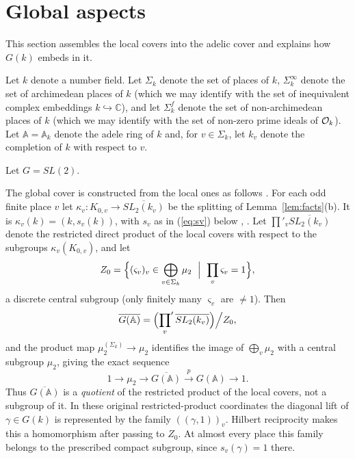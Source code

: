 \documentclass[12pt,letterpaper,openany]{book}
\theoremstyle{plain}
\theoremstyle{definition}
\theoremstyle{remark}
\theoremstyle{remark}
\begin{document}
\section{Global aspects}\label{sec:global}

This section assembles the local covers into the adelic cover and explains how $G(k)$ embeds in it.


Let $k$ denote a number field. Let $\Sigma _k$ denote the set of places of
$k$, $\Sigma _k^\infty $ denote the set of archimedean places of
$k$ (which we may identify with the set of inequivalent
complex embeddings $k\hookrightarrow {\mathbb{C}}$), and let
$\Sigma _k^f$ denote the set of non-archimedean places of
$k$ (which we may identify with the set of non-zero prime ideals of
${\cal{O}}_k$). Let ${\mathbb{A}}={\mathbb{A}}_k$ denote the adele
ring of $k$ and, for $v\in \Sigma _k$, let $k_v$ denote
the completion of $k$ with respect to $v$.

Let $G=SL(2)$.

The global cover is constructed from the local ones as follows
\cite{K2}. For each odd finite place $v$ let
$\kappa_v:K_{0,v}\rightarrow\overline{SL_2(k_v)}$ be the splitting of
Lemma~\ref{lem:facts}(b). It is $\kappa_v(k)=(k,s_v(k))$, with
$s_v$ as in (\ref{eq:sv}) below \cite{K2}, \cite{Ge2}. Let
$\prod'_v\overline{SL_2(k_v)}$ denote the restricted direct product of the
local covers with respect to the subgroups $\kappa_v(K_{0,v})$, and let
\[
Z_0=\Bigl\{(\varsigma_v)_v\in\bigoplus_{v\in\Sigma_k}\mu_2\ \Bigm|\
\prod_v\varsigma_v=1\Bigr\},
\]
a discrete central subgroup (only finitely many $\varsigma_v$ are
$\neq 1$). Then
\[
\overline{G({\mathbb{A}})}=\Bigl({\prod_v}'\,\overline{SL_2(k_v)}\Bigr)\Big/Z_0 ,
\]
and the product map $\mu_2^{(\Sigma_k)}\rightarrow\mu_2$ identifies the
image of $\bigoplus_v\mu_2$ with a central subgroup $\mu_2$, giving the
exact sequence
\begin{equation}
1\rightarrow \mu _2\rightarrow
\overline{G({\mathbb{A}})}\stackrel{p}{\rightarrow }G({\mathbb{A}})\rightarrow 1.
\end{equation}
Thus $\overline{G({\mathbb{A}})}$ is a \emph{quotient} of the restricted
product of the local covers, not a subgroup of it. In these original
restricted-product coordinates the diagonal lift of
$\gamma\in G(k)$ is represented by the family $((\gamma,1))_v$.
Hilbert reciprocity makes this a homomorphism after passing to $Z_0$.
At almost every place this family belongs to the prescribed compact
subgroup, since $s_v(\gamma)=1$ there.
\end{document}
